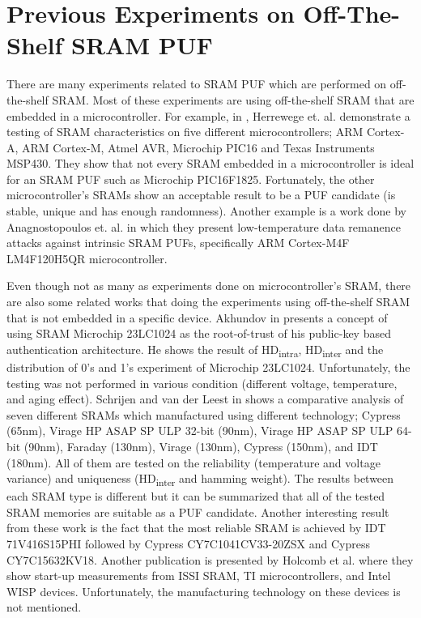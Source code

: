 \section{Previous Experiments on Off-The-Shelf SRAM PUF}\label{ch:prev_experiments}
There are many experiments related to SRAM PUF which are performed on off-the-shelf SRAM. Most of these experiments are using off-the-shelf SRAM that are embedded in a microcontroller. For example, in \cite{VanHerrewege:2013:DIP:2541806.2512493}, Herrewege et. al. demonstrate a testing of SRAM characteristics on five different microcontrollers; ARM Cortex-A, ARM Cortex-M, Atmel AVR, Microchip PIC16 and Texas Instruments MSP430. They show that not every SRAM embedded in a microcontroller is ideal for an SRAM PUF such as Microchip PIC16F1825. Fortunately, the other microcontroller's SRAMs show an acceptable result to be a PUF candidate (is stable, unique and has enough randomness).
Another example is a work done by Anagnostopoulos et. al. \cite{cryptoeprint:2016:769} in which they present low-temperature data remanence attacks against intrinsic SRAM PUFs, specifically ARM Cortex-M4F LM4F120H5QR microcontroller.

Even though not as many as experiments done on microcontroller's SRAM, there are also some related works that doing the experiments using off-the-shelf SRAM that is not embedded in a specific device. Akhundov in \cite{haji} presents a concept of using SRAM Microchip 23LC1024 as the root-of-trust of his public-key based authentication architecture. He shows the result of HD\textsubscript{intra}, HD\textsubscript{inter} and the distribution of 0's and 1's experiment of Microchip 23LC1024. Unfortunately, the testing was not performed in various condition (different voltage, temperature, and aging effect).
Schrijen and van der Leest in \cite{Schrijen:2012:CAS:2492708.2493033} shows a comparative analysis of seven different SRAMs which manufactured using different technology; Cypress  (65nm),
Virage HP ASAP SP ULP 32-bit (90nm), Virage HP ASAP SP ULP 64-bit (90nm), Faraday  (130nm), Virage  (130nm), Cypress  (150nm), and IDT  (180nm). All of them are tested on the reliability (temperature and voltage variance) and uniqueness (HD\textsubscript{inter} and hamming weight). The results between each SRAM type is different but it can be summarized that all of the tested SRAM memories are suitable as a PUF candidate. Another interesting result from these work is the fact that the most reliable SRAM is achieved by IDT 71V416S15PHI followed by Cypress CY7C1041CV33-20ZSX and Cypress CY7C15632KV18.
Another publication is presented by Holcomb et al. \cite{4674345} where they show start-up measurements from ISSI SRAM, TI microcontrollers, and Intel WISP devices. Unfortunately, the manufacturing technology on these devices is not mentioned.
